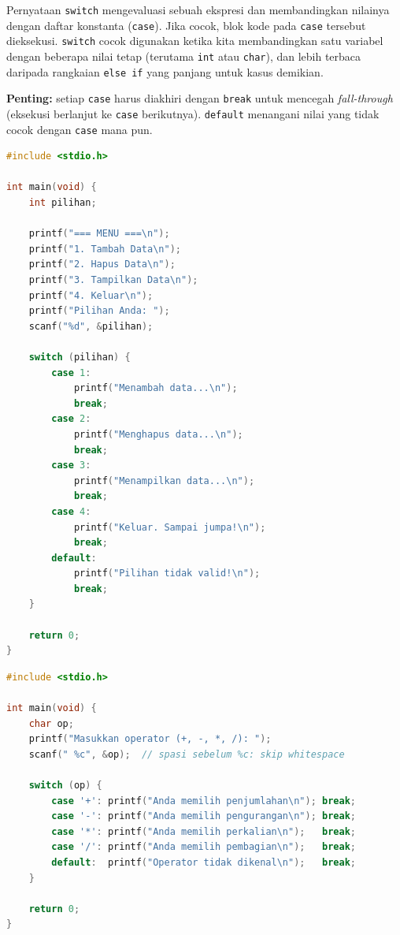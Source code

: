 \documentclass[../main.tex]{subfiles}
\begin{document}
Pernyataan \texttt{switch} mengevaluasi sebuah ekspresi dan membandingkan nilainya dengan daftar konstanta (\texttt{case}). Jika cocok, blok kode pada \texttt{case} tersebut dieksekusi. \texttt{switch} cocok digunakan ketika kita membandingkan satu variabel dengan beberapa nilai tetap (terutama \texttt{int} atau \texttt{char}), dan lebih terbaca daripada rangkaian \texttt{else if} yang panjang untuk kasus demikian.

\textbf{Penting:} setiap \texttt{case} harus diakhiri dengan \texttt{break} untuk mencegah \textit{fall-through} (eksekusi berlanjut ke \texttt{case} berikutnya). \texttt{default} menangani nilai yang tidak cocok dengan \texttt{case} mana pun.

\begin{lstlisting}[language=C,caption=Menu dengan \texttt{switch}]
#include <stdio.h>

int main(void) {
    int pilihan;
    
    printf("=== MENU ===\n");
    printf("1. Tambah Data\n");
    printf("2. Hapus Data\n");
    printf("3. Tampilkan Data\n");
    printf("4. Keluar\n");
    printf("Pilihan Anda: ");
    scanf("%d", &pilihan);
    
    switch (pilihan) {
        case 1:
            printf("Menambah data...\n");
            break;
        case 2:
            printf("Menghapus data...\n");
            break;
        case 3:
            printf("Menampilkan data...\n");
            break;
        case 4:
            printf("Keluar. Sampai jumpa!\n");
            break;
        default:
            printf("Pilihan tidak valid!\n");
            break;
    }
    
    return 0;
}
\end{lstlisting}

\begin{lstlisting}[language=C,caption=\texttt{switch} dengan \texttt{char} --- kalkulator]
#include <stdio.h>

int main(void) {
    char op;
    printf("Masukkan operator (+, -, *, /): ");
    scanf(" %c", &op);  // spasi sebelum %c: skip whitespace
    
    switch (op) {
        case '+': printf("Anda memilih penjumlahan\n"); break;
        case '-': printf("Anda memilih pengurangan\n"); break;
        case '*': printf("Anda memilih perkalian\n");   break;
        case '/': printf("Anda memilih pembagian\n");   break;
        default:  printf("Operator tidak dikenal\n");   break;
    }
    
    return 0;
}
\end{lstlisting}
\end{document}
